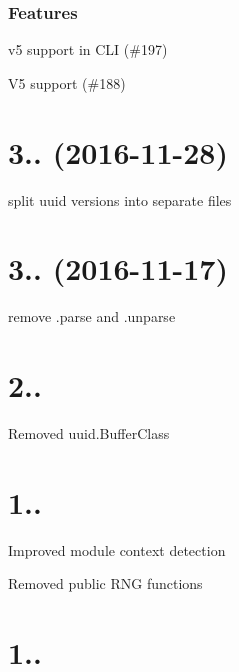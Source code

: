 \subsubsection*{Features}


\begin{DoxyItemize}
\item v5 support in C\+LI (\#197)
\item V5 support (\#188)
\end{DoxyItemize}

\section*{3.. (2016-\/11-\/28)}


\begin{DoxyItemize}
\item split uuid versions into separate files
\end{DoxyItemize}

\section*{3.. (2016-\/11-\/17)}


\begin{DoxyItemize}
\item remove .parse and .unparse
\end{DoxyItemize}

\section*{2..}


\begin{DoxyItemize}
\item Removed uuid.\+Buffer\+Class
\end{DoxyItemize}

\section*{1..}


\begin{DoxyItemize}
\item Improved module context detection
\item Removed public R\+NG functions
\end{DoxyItemize}

\section*{1..}


